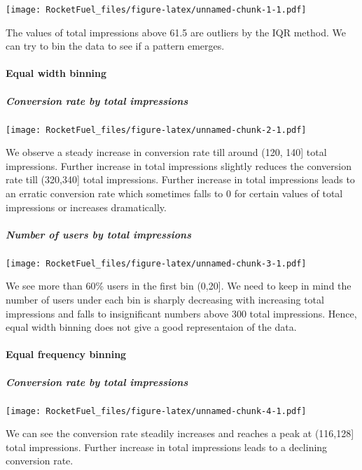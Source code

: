 \documentclass[
]{article}
\begin{document}
\texttt{[image: RocketFuel\_files/figure-latex/unnamed-chunk-1-1.pdf]}

The values of total impressions above 61.5 are outliers by the IQR
method. We can try to bin the data to see if a pattern emerges.

\hypertarget{equal-width-binning}{%
\paragraph{Equal width binning}\label{equal-width-binning}}

\hypertarget{conversion-rate-by-total-impressions-1}{%
\subparagraph{Conversion rate by total
impressions}\label{conversion-rate-by-total-impressions-1}}

\texttt{[image: RocketFuel\_files/figure-latex/unnamed-chunk-2-1.pdf]}

We observe a steady increase in conversion rate till around (120, 140{]}
total impressions. Further increase in total impressions slightly
reduces the conversion rate till (320,340{]} total impressions. Further
increase in total impressions leads to an erratic conversion rate which
sometimes falls to 0 for certain values of total impressions or
increases dramatically.

\hypertarget{number-of-users-by-total-impressions}{%
\subparagraph{Number of users by total
impressions}\label{number-of-users-by-total-impressions}}

\texttt{[image: RocketFuel\_files/figure-latex/unnamed-chunk-3-1.pdf]}

We see more than 60\% users in the first bin (0,20{]}. We need to keep
in mind the number of users under each bin is sharply decreasing with
increasing total impressions and falls to insignificant numbers above
300 total impressions. Hence, equal width binning does not give a good
representaion of the data.

\hypertarget{equal-frequency-binning}{%
\paragraph{Equal frequency binning}\label{equal-frequency-binning}}

\hypertarget{conversion-rate-by-total-impressions-2}{%
\subparagraph{Conversion rate by total
impressions}\label{conversion-rate-by-total-impressions-2}}

\texttt{[image: RocketFuel\_files/figure-latex/unnamed-chunk-4-1.pdf]}

We can see the conversion rate steadily increases and reaches a peak at
(116,128{]} total impressions. Further increase in total impressions
leads to a declining conversion rate.
\end{document}
